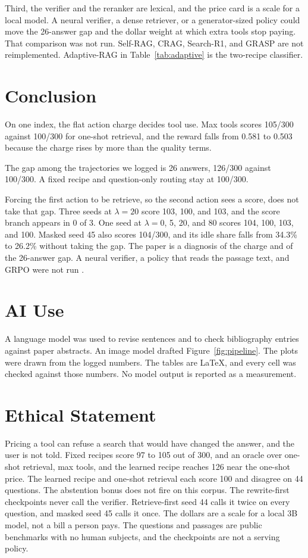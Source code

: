\documentclass[letterpaper]{article} %
\begin{document}
Third, the verifier and the reranker are lexical, and the price card is a scale for a local model. A neural verifier, a dense retriever, or a generator-sized policy could move the 26-answer gap and the dollar weight at which extra tools stop paying. That comparison was not run. Self-RAG, CRAG, Search-R1, and GRASP are not reimplemented. Adaptive-RAG in Table~\ref{tab:adaptive} is the two-recipe classifier.

\section{Conclusion}
On one index, the flat action charge decides tool use. Max tools scores 105/300 against 100/300 for one-shot retrieval, and the reward falls from 0.581 to 0.503 because the charge rises by more than the quality terms.

The gap among the trajectories we logged is 26 answers, 126/300 against 100/300. A fixed recipe and question-only routing stay at 100/300.

Forcing the first action to be retrieve, so the second action sees a score, does not take that gap. Three seeds at \(\lambda{=}20\) score 103, 100, and 103, and the score branch appears in 0 of 3. One seed at \(\lambda{=}0\), 5, 20, and 80 scores 104, 100, 103, and 100. Masked seed 45 also scores 104/300, and its idle share falls from 34.3\% to 26.2\% without taking the gap. The paper is a diagnosis of the charge and of the 26-answer gap. A neural verifier, a policy that reads the passage text, and GRPO were not run \cite{shao2024deepseekmath,gandhi2026grasp}.

\section*{AI Use}
A language model was used to revise sentences and to check bibliography entries against paper abstracts. An image model drafted Figure~\ref{fig:pipeline}. The plots were drawn from the logged numbers. The tables are LaTeX, and every cell was checked against those numbers. No model output is reported as a measurement.

\section*{Ethical Statement}
Pricing a tool can refuse a search that would have changed the answer, and the user is not told. Fixed recipes score 97 to 105 out of 300, and an oracle over one-shot retrieval, max tools, and the learned recipe reaches 126 near the one-shot price. The learned recipe and one-shot retrieval each score 100 and disagree on 44 questions. The abstention bonus does not fire on this corpus. The rewrite-first checkpoints never call the verifier. Retrieve-first seed 44 calls it twice on every question, and masked seed 45 calls it once. The dollars are a scale for a local 3B model, not a bill a person pays. The questions and passages are public benchmarks with no human subjects, and the checkpoints are not a serving policy.
\end{document}

